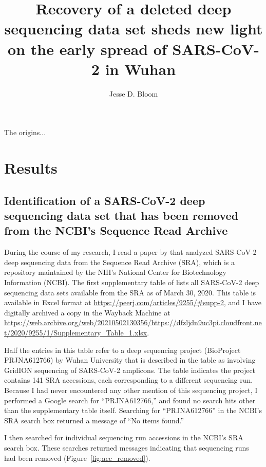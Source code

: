\documentclass[9pt,twocolumn,twoside]{gsajnl_modified}
\title{Recovery of a deleted deep sequencing data set sheds new light on the early spread of SARS-CoV-2 in Wuhan}
\author[]{\Large Jesse D. Bloom}
\affil[]{Fred Hutchinson Cancer Research Center}
\affil[]{Howard Hughes Medical Institute}
\affil[]{Seattle, WA, USA}
\begin{document}
\maketitle
\thispagestyle{firststyle}
\firstpagefootnote

\vspace{-33pt}%

\lettrine[lines=2]{\color{color2}T}{}he origins... 

\section{Results}

\subsection{Identification of a SARS-CoV-2 deep sequencing data set that has been removed from the NCBI's Sequence Read Archive}
During the course of my research, I read a paper by \citet{farkas2020insights} that analyzed SARS-CoV-2 deep sequencing data from the Sequence Read Archive (SRA), which is a repository maintained by the NIH's National Center for Biotechnology Information (NCBI).
The first supplementary table of \citet{farkas2020insights} lists all SARS-CoV-2 deep sequencing data sets available from the SRA as of March 30, 2020.
This table is available in Excel format at \url{https://peerj.com/articles/9255/#supp-2}, and I have digitally archived a copy in the Wayback Machine at \url{https://web.archive.org/web/20210502130356/https://dfzljdn9uc3pi.cloudfront.net/2020/9255/1/Supplementary_Table_1.xlsx}. 

Half the entries in this table refer to a deep sequencing project (BioProject PRJNA612766) by Wuhan University that is described in the table as involving GridION sequencing of SARS-CoV-2 amplicons.
The table indicates the project contains 141 SRA accessions, each corresponding to a different sequencing run.
Because I had never encountered any other mention of this sequencing project, I performed a Google search for ``PRJNA612766,'' and found no search hits other than the supplementary table itself.
Searching for ``PRJNA612766'' in the NCBI's SRA search box returned a message of ``No items found.''

I then searched for individual sequencing run accessions in the NCBI's SRA search box.
These searches returned messages indicating that sequencing runs had been removed (Figure~\ref{fig:acc_removed}).
\end{document}
